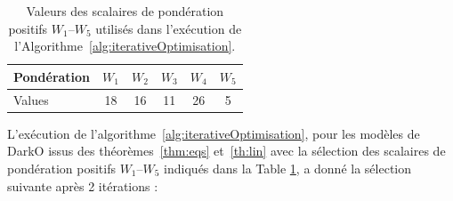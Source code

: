 \begin{table}[ht]
    \centering
    \begin{tabular}{|l|c|c|c|c|c|} 
    \hline
    Pondération & $W_1$ & $W_2$ & $W_3$ & $W_4$ & $W_5$ \\ \hline
    Values &18 & 16 & 11 & 26 & 5 \\ \hline
    \end{tabular}
    \caption{\label{tab:W1W5} Valeurs des scalaires de pondération positifs $W_1$--$W_5$ utilisés dans l'exécution de l'Algorithme~\ref{alg:iterativeOptimisation}.}
\end{table}
L'exécution de l'algorithme~\ref{alg:iterativeOptimisation}, pour les modèles de DarkO issus des théorèmes~\ref{thm:eqs} et~\ref{th:lin} avec la sélection des scalaires de pondération positifs $W_1$--$W_5$ indiqués dans la Table \ref{tab:W1W5}, a donné la sélection suivante après 2 itérations :
